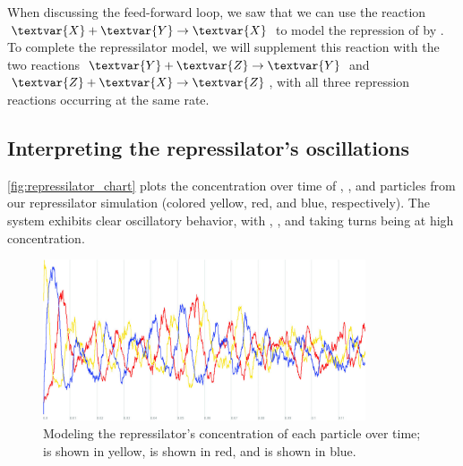 When discussing the feed-forward loop, we saw that we can use the reaction $\textvar{X} + \textvar{Y} \rightarrow \textvar{X}$ to model the repression of  by . To complete the repressilator model, we will supplement this reaction with the two reactions $\textvar{Y} + \textvar{Z} \rightarrow \textvar{Y}$ and $\textvar{Z} + \textvar{X} \rightarrow \textvar{Z}$, with all three repression reactions occurring at the same rate.\\

\begin{note}\end{note}

\FloatBarrier
{}
\subsection{Interpreting the repressilator's oscillations}

\autoref{fig:repressilator_chart} plots the concentration over time of , , and  particles from our repressilator simulation (colored yellow, red, and blue, respectively). The system exhibits clear oscillatory behavior, with , , and  taking turns being at high concentration.\\

\begin{qbox}\end{qbox}

\begin{figure}[h]
\centering
\mySfFamily
\includegraphics[width = 0.85\textwidth]{../images_CMYK/cellblender_repressilator_white}
\caption{Modeling the repressilator's concentration of each particle over time;  is shown in yellow,  is shown in red, and  is shown in blue.}
\label{fig:repressilator_chart}
\end{figure}

